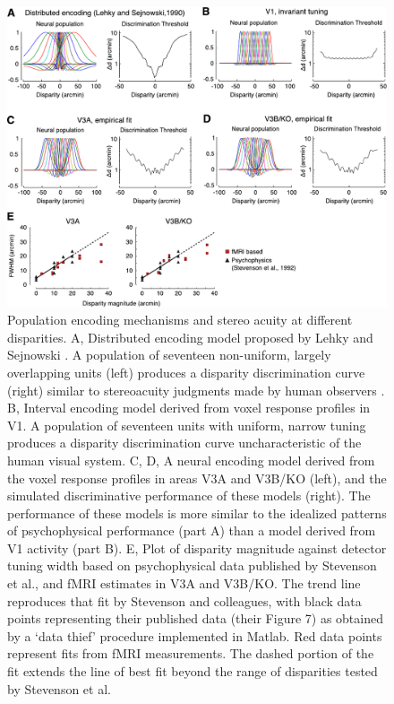 \begin{figure}
  \centering
  \includegraphics[width=14cm, keepaspectratio]{fig11}
  \caption[Population encoding mechanisms and stereo acuity at different disparities.]{Population encoding mechanisms and stereo acuity at different disparities. A, Distributed encoding model proposed by Lehky and Sejnowski \cite{Lehky:1990fk}. A population of seventeen non-uniform, largely overlapping units (left) produces a disparity discrimination curve (right) similar to stereoacuity judgments made by human observers \cite{Badcock:1985ly}. B, Interval encoding model derived from voxel response profiles in V1. A population of seventeen units with uniform, narrow tuning produces a disparity discrimination curve uncharacteristic of the human visual system. C, D, A neural encoding model derived from the voxel response profiles in areas V3A and V3B/KO (left), and the simulated discriminative performance of these models (right). The performance of these models is more similar to the idealized patterns of psychophysical performance (part A) than a model derived from V1 activity (part B). E, Plot of disparity magnitude against detector tuning width based on psychophysical data published by Stevenson et al.\cite{Stevenson:1992kx}, and fMRI estimates in V3A and V3B/KO. The trend line reproduces that fit by Stevenson and colleagues, with black data points representing their published data (their Figure 7) as obtained by a `data thief' procedure implemented in Matlab. Red data points represent fits from fMRI measurements. The dashed portion of the fit extends the line of best fit beyond the range of disparities tested by Stevenson et al.\cite{Stevenson:1992kx}}
  \label{fig:ch4fig11}
\end{figure}

